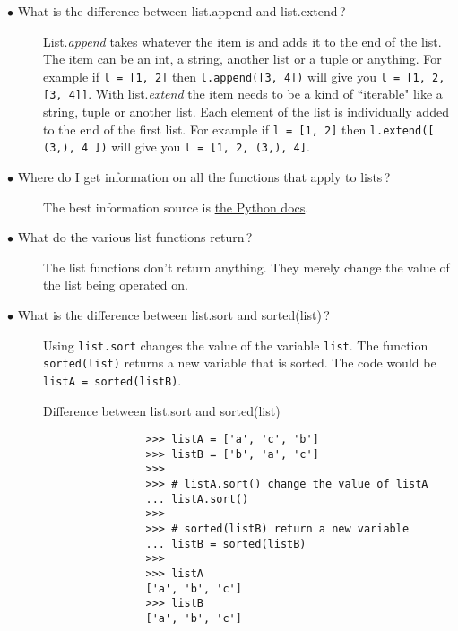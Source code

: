 \documentclass{article}
\newcommand{\inlinecode}[1]{\texttt{#1}}
\newcommand{\link}[2]{\textcolor{blue}{\href{#2}{#1}}}
\newcommand{\question}[1]{\item[$\bullet$ #1] \hfil}
\newenvironment{answer}{\newline}{}
\newenvironment{faq}{\begin{description}}{\end{description}}
\begin{document}
\begin{faq}
		\question{What is the difference between list.append and list.extend\,?}
		\begin{answer}
			List.\textit{append} takes whatever the item is and adds it to the end of the list. The item can be an int, a string, another list or a tuple or anything. For example if \inlinecode{l = [1, 2]} then \inlinecode{l.append([3, 4])} will give you \inlinecode{l = [1, 2, [3, 4]]}. With list.\textit{extend} the item needs to be a kind of ``iterable" like a string, tuple or another list. Each element of the list is individually added to the end of the first list. For example if \inlinecode{l = [1, 2]} then \inlinecode{l.extend([ (3,), 4 ])} will give you \inlinecode{l = [1, 2, (3,), 4]}.
		\end{answer}
		
		\question{Where do I get information on all the functions that apply to lists\,?}
		\begin{answer}
			The best information source is \link{the Python docs}{https://docs.python.org/3/tutorial/datastructures.html}.
		\end{answer}
		
		\question{What do the various list functions return\,?}
		\begin{answer}
			The list functions don't return anything. They merely change the value of the list being operated on.
		\end{answer}
		
		\question{What is the difference between list.sort and sorted(list)\,?}
		\begin{answer}
			Using \inlinecode{list.sort} changes the value of the variable \inlinecode{list}. The function \inlinecode{sorted(list)} returns a new variable that is sorted. The code would be \inlinecode{listA = sorted(listB)}. \newpage
			
			\begin{table}[htb]
				\caption{Difference between list.sort and sorted(list)}
				\begin{verbatim}
				>>> listA = ['a', 'c', 'b']
				>>> listB = ['b', 'a', 'c']
				>>>
				>>> # listA.sort() change the value of listA
				... listA.sort()
				>>>
				>>> # sorted(listB) return a new variable
				... listB = sorted(listB)
				>>>
				>>> listA
				['a', 'b', 'c']
				>>> listB
				['a', 'b', 'c']
				\end{verbatim}
			\end{table}
			
		\end{answer}
		

\end{faq}
\end{document}
